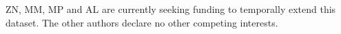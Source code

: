 ZN, MM, MP and AL are currently seeking funding to temporally extend this dataset.
The other authors declare no other competing interests.
